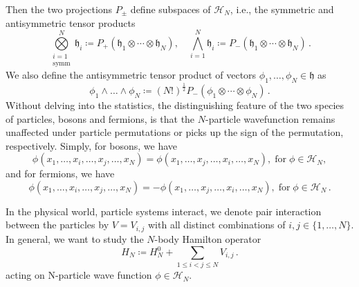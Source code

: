 \documentclass[12pt,a4paper]{article}
\numberwithin{equation}{section}
\newcommand{\1}{\mathbb{I}}
\newcommand{\h}{\mathfrak{h}}
\newcommand{\HH}{\mathcal{H}}
\newcommand{\half}{\frac{1}{2}}
\theoremstyle{plain}
\theoremstyle{definition}
\theoremstyle{remark}
\theoremstyle{plain}
\theoremstyle{definition}
\theoremstyle{remark}
\begin{document}
Then the two projections $P_{\pm}$ define subspaces of $\HH_N$, i.e., the symmetric and antisymmetric tensor products
\begin{equation}
	\bigotimes\limits_{\substack{i=1\\ \mathrm{symm}}}^N\h_i \coloneq P_+(\h_1\otimes\cdots\otimes\h_N) , \quad 
	\bigwedge\limits_{i=1}^N\h_i \coloneq P_-(\h_1\otimes\cdots\otimes\h_N) \,. \label{eq:orthoproj}
\end{equation}
We also define the antisymmetric tensor product of vectors $\phi_1,\ldots,\phi_N \in \h$ as
\begin{equation}
	\phi_1\wedge\ldots\wedge\phi_N \coloneq (N!)^{\half}P_-(\phi_1\otimes\cdots\otimes \phi_N)\,.
\end{equation}
Without delving into the statistics, the distinguishing feature of the two species of particles, bosons and fermions, is that the $N$-particle wavefunction remains unaffected under particle permutations or picks up the sign of the permutation, respectively. Simply, for bosons, we have
\begin{equation}
	\phi(x_1,\ldots,x_i,\ldots,x_j,\ldots,x_N) =\phi(x_1,\ldots,x_j,\ldots,x_i,\ldots,x_N), \; \mathrm{for}\; \phi \in \HH_N, 
\end{equation}
and for fermions, we have
\begin{equation}
	\phi(x_1,\ldots,x_i,\ldots,x_j,\ldots,x_N) =-\phi(x_1,\ldots,x_j,\ldots,x_i,\ldots,x_N), \; \text{for} \;\phi \in \HH_N \,.
\end{equation}


In the physical world, particle systems interact, we denote pair interaction between the particles by $V= V_{i,j}$ with all distinct combinations of $i,j \in \{1,\ldots,N\}$.
In general, we want to study the $N$-body Hamilton operator
\begin{equation}
	H_N \coloneq H_N^0 + \sum\limits_{1\leq i<j\leq N}V_{i,j} 
	\,.
 \end{equation}
acting on N-particle wave function $\phi \in \HH_N$.
\end{document}
